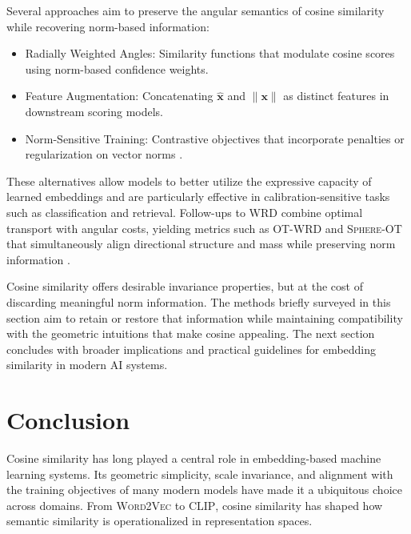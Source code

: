 \documentclass[11pt]{article}
\begin{document}
Several approaches aim to preserve the angular semantics of cosine similarity while recovering norm-based information:
\begin{itemize}
	\setlength\leftskip{-1em} 
	\item {Radially Weighted Angles}: Similarity functions that modulate cosine scores using norm-based confidence weights.
	\item {Feature Augmentation}: Concatenating $\hat{\mathbf{x}}$ and $\|\mathbf{x}\|$ as distinct features in downstream scoring models.
	\item {Norm-Sensitive Training}: Contrastive objectives that incorporate penalties or regularization on vector norms \citep{radford_2021_LearningTransferableVisual, wang_2020_UnderstandingContrastiveRepresentation}.
\end{itemize}

These alternatives allow models to better utilize the expressive capacity of learned embeddings and are particularly effective in calibration-sensitive tasks such as classification and retrieval. Follow-ups to WRD combine optimal transport with angular costs, yielding metrics such as \textsc{OT-WRD} and \textsc{Sphere-OT} that simultaneously align directional structure and mass while preserving norm information \citep{yokoi_2020_WordRotatorsDistance}.

Cosine similarity offers desirable invariance properties, but at the cost of discarding meaningful norm information. The methods briefly surveyed in this section aim to retain or restore that information while maintaining compatibility with the geometric intuitions that make cosine appealing. The next section concludes with broader implications and practical guidelines for embedding similarity in modern AI systems.


\section{Conclusion}\label{sec:conclusion}

Cosine similarity has long played a central role in embedding-based machine learning systems. Its geometric simplicity, scale invariance, and alignment with the training objectives of many modern models have made it a ubiquitous choice across domains. From \textsc{Word2Vec} to \textsc{CLIP}, cosine similarity has shaped how semantic similarity is operationalized in  representation spaces.
\end{document}
